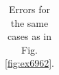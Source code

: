 \begin{table}
\begin{tabular}{lrrrrrrrrrrrrr}

\bottomrule
\end{tabular}
\caption{Errors for the same cases as in Fig. \ref{fig:ex6962}.}
\label{table:ex6962}
\end{table}

